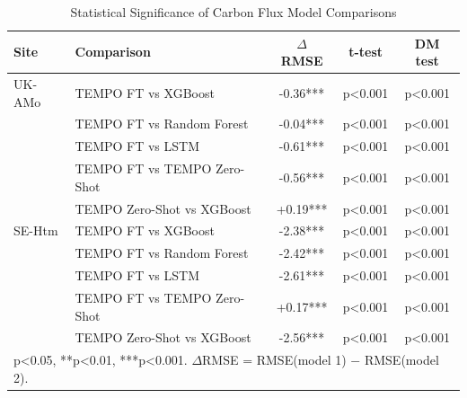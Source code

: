 \begin{table}[h]
\centering
\caption{Statistical Significance of Carbon Flux Model Comparisons}
\begin{tabular}{llccc}
\hline
Site & Comparison & $\Delta$ RMSE & t-test & DM test \\
\hline
UK-AMo & TEMPO FT vs XGBoost & -0.36*** & p<0.001 & p<0.001 \\
 & TEMPO FT vs Random Forest & -0.04*** & p<0.001 & p<0.001 \\
 & TEMPO FT vs LSTM & -0.61*** & p<0.001 & p<0.001 \\
 & TEMPO FT vs TEMPO Zero-Shot & -0.56*** & p<0.001 & p<0.001 \\
 & TEMPO Zero-Shot vs XGBoost & +0.19*** & p<0.001 & p<0.001 \\
\hline
SE-Htm & TEMPO FT vs XGBoost & -2.38*** & p<0.001 & p<0.001 \\
 & TEMPO FT vs Random Forest & -2.42*** & p<0.001 & p<0.001 \\
 & TEMPO FT vs LSTM & -2.61*** & p<0.001 & p<0.001 \\
 & TEMPO FT vs TEMPO Zero-Shot & +0.17*** & p<0.001 & p<0.001 \\
 & TEMPO Zero-Shot vs XGBoost & -2.56*** & p<0.001 & p<0.001 \\
\hline
\multicolumn{5}{l}{\footnotesize *p<0.05, **p<0.01, ***p<0.001. $\Delta$RMSE = RMSE(model 1) $-$ RMSE(model 2).} \\
\end{tabular}
\label{tab:significance}
\end{table}